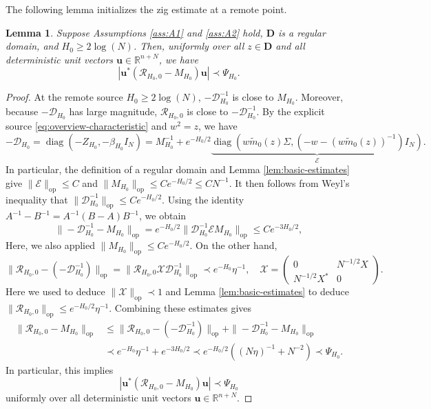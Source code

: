 \documentclass[11pt,reqno]{amsart}
\def\R{\mathbb{R}}
\def\u{\mathbf{u}}
\def\cX{\mathcal{X}}
\def\cE{\mathcal{E}}
\def\cR{\mathcal{R}}
\def\cD{\mathcal{D}}
\def\bD{\mathbf{D}}
\def\op{\mathrm{op}}
\def\diag{\operatorname{diag}}
\newtheorem{lemma}[theorem]{Lemma}
\theoremstyle{definition}
\numberwithin{equation}{section}
\numberwithin{figure}{section}
\begin{document}
The following lemma initializes the zig estimate at a remote point.
\begin{lemma}\label{lem:zig-initialization}
Suppose Assumptions \ref{ass:A1} and \ref{ass:A2} hold, $\bD$ is a regular domain, and $H_0\geq 2\log(N)$. Then, uniformly over all $z\in\bD$ and all deterministic unit vectors $\u\in\R^{n+N}$, we have
\[
    |\u^*(\cR_{H_0,0}-M_{H_0})\u|\prec \Psi_{H_0}.
\]
\end{lemma}
\begin{proof}
At the remote source $H_0\geq 2\log(N)$, $-\cD_{H_0}^{-1}$ is close to $M_{H_0}$. Moreover, because $-\cD_{H_0}$ has large magnitude, $\cR_{H_0,0}$ is close to $-\cD_{H_0}^{-1}$. By the explicit source \eqref{eq:overview-characteristic} and $w^2=z$, we have
\[
    -\cD_{H_0}=\diag(-Z_{H_0},-\beta_{H_0}I_N)=M_{H_0}^{-1}+e^{-H_0/2}\underbrace{\diag(w\widetilde m_0(z)\Sigma, (-w-(w\widetilde m_0(z))^{-1})I_N)}_{\cE}.
\]
In particular, the definition of a regular domain and Lemma \ref{lem:basic-estimates} give $\|\cE\|_\op\leq C$ and $\|M_{H_0}\|_\op\leq Ce^{-H_0/2} \leq CN^{-1}$. It then follows from Weyl's inequality that $\|\cD_{H_0}^{-1}\|_\op\leq Ce^{-H_0/2}$. Using the identity $A^{-1}-B^{-1}=A^{-1}(B-A)B^{-1}$, we obtain
\[
    \|-\cD_{H_0}^{-1}-M_{H_0}\|_\op=e^{-H_0/2}\|\cD_{H_0}^{-1}\cE M_{H_0}\|_\op\leq Ce^{-3H_0/2},
\]
Here, we also applied $\|M_{H_0}\|_\op\leq Ce^{-H_0/2}$. On the other hand,
\[
    \|\cR_{H_0,0}-(-\cD_{H_0}^{-1})\|_\op=\|\cR_{H_0,0}\cX\cD_{H_0}^{-1}\|_\op\prec e^{-H_0}\eta^{-1},\quad \cX=\begin{pmatrix}
        0 & N^{-1/2}X\\
        N^{-1/2}X^* & 0
    \end{pmatrix}.
\]
Here we used \cite[Lemma~3.8(b)]{fan2026anisotropic} to deduce $\|\cX\|_\op\prec 1$ and Lemma \ref{lem:basic-estimates} to deduce $\|\cR_{H_0,0}\|_\op\leq e^{-H_0/2}\eta^{-1}$. Combining these estimates gives
\begin{align*}
    \|\cR_{H_0,0}-M_{H_0}\|_\op&\leq \|\cR_{H_0,0}-(-\cD_{H_0}^{-1})\|_\op+\|-\cD_{H_0}^{-1}-M_{H_0}\|_\op\\
    &\prec e^{-H_0}\eta^{-1}+e^{-3H_0/2}\prec e^{-H_0/2}((N\eta)^{-1}+N^{-2})\prec \Psi_{H_0}.
\end{align*}
In particular, this implies
\[
    |\u^*(\cR_{H_0,0}-M_{H_0})\u|\prec \Psi_{H_0}
\]
uniformly over all deterministic unit vectors $\u\in\R^{n+N}$.
\end{proof}
\end{document}
